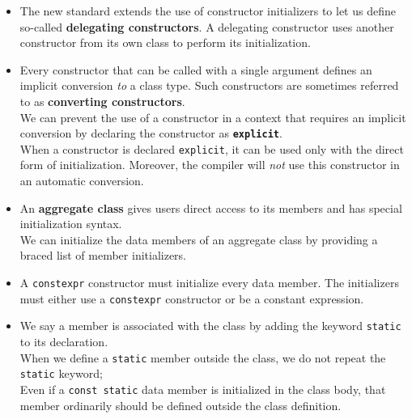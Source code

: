 \begin{itemize}
\item
The new standard extends the use of constructor initializers to let us define so-called \textbf{delegating constructors}. A delegating constructor uses another constructor from its own class to perform its initialization.

\item
Every constructor that can be called with a single argument defines an implicit conversion \textit{to} a class type. Such constructors are sometimes referred to as \textbf{converting constructors}.\\
We can prevent the use of a constructor in a context that requires an implicit conversion by declaring the constructor as \textbf{\texttt{explicit}}.\\
When a constructor is declared \texttt{explicit}, it can be used only with the direct form of initialization. Moreover, the compiler will \textit{not} use this constructor in an automatic conversion.

\item
An \textbf{aggregate class} gives users direct access to its members and has special initialization syntax.\\
We can initialize the data members of an aggregate class by providing a braced list of member initializers.

\item
A \texttt{constexpr} constructor must initialize every data member. The initializers must either use a \texttt{constexpr} constructor or be a constant expression.

\item
We say a member is associated with the class by adding the keyword \texttt{static} to its declaration.\\
When we define a \texttt{static} member outside the class, we do not repeat the \texttt{static} keyword;\\
Even if a \texttt{const static} data member is initialized in the class body, that member ordinarily should be defined outside the class definition.

\end{itemize}